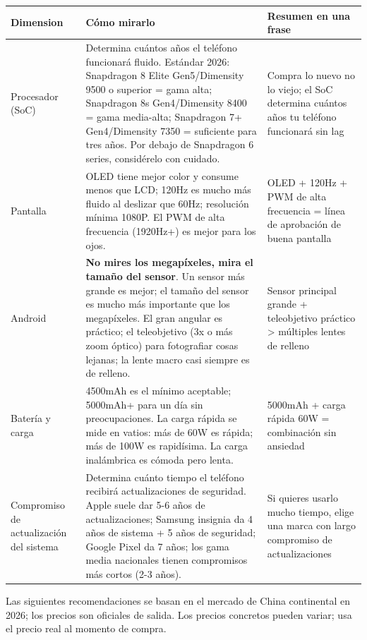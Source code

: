 \begin{center}
\begin{tabularx}{\linewidth}{|X|X|X|}
\hline
\textbf{Dimension} & \textbf{Cómo mirarlo} & \textbf{Resumen en una frase} \tabularnewline
\hline
Procesador (SoC) & Determina cuántos años el teléfono funcionará fluido. Estándar 2026: Snapdragon 8 Elite Gen5/Dimensity 9500 o superior = gama alta; Snapdragon 8s Gen4/Dimensity 8400 = gama media-alta; Snapdragon 7+ Gen4/Dimensity 7350 = suficiente para tres años. Por debajo de Snapdragon 6 series, considérelo con cuidado. & Compra lo nuevo no lo viejo; el SoC determina cuántos años tu teléfono funcionará sin lag \tabularnewline
Pantalla & OLED tiene mejor color y consume menos que LCD; 120Hz es mucho más fluido al deslizar que 60Hz; resolución mínima 1080P. El PWM de alta frecuencia (1920Hz+) es mejor para los ojos. & OLED + 120Hz + PWM de alta frecuencia = línea de aprobación de buena pantalla \tabularnewline
Android & \textbf{No mires los megapíxeles, mira el tamaño del sensor}. Un sensor más grande es mejor; el tamaño del sensor es mucho más importante que los megapíxeles. El gran angular es práctico; el teleobjetivo (3x o más zoom óptico) para fotografiar cosas lejanas; la lente macro casi siempre es de relleno. & Sensor principal grande + teleobjetivo práctico > múltiples lentes de relleno \tabularnewline
Batería y carga & 4500mAh es el mínimo aceptable; 5000mAh+ para un día sin preocupaciones. La carga rápida se mide en vatios: más de 60W es rápida; más de 100W es rapidísima. La carga inalámbrica es cómoda pero lenta. & 5000mAh + carga rápida 60W = combinación sin ansiedad \tabularnewline
Compromiso de actualización del sistema & Determina cuánto tiempo el teléfono recibirá actualizaciones de seguridad. Apple suele dar 5-6 años de actualizaciones; Samsung insignia da 4 años de sistema + 5 años de seguridad; Google Pixel da 7 años; los gama media nacionales tienen compromisos más cortos (2-3 años). & Si quieres usarlo mucho tiempo, elige una marca con largo compromiso de actualizaciones \tabularnewline
\hline
\end{tabularx}
\end{center}


Las siguientes recomendaciones se basan en el mercado de China continental en 2026; los precios son oficiales de salida. Los precios concretos pueden variar; usa el precio real al momento de compra.

